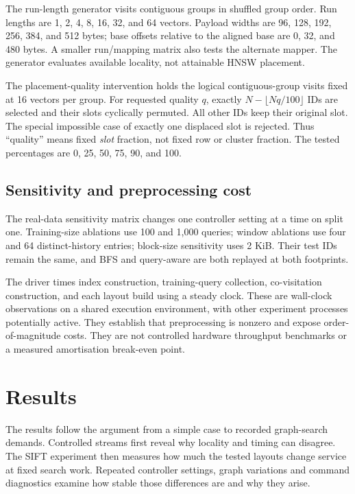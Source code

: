 \documentclass[11pt,a4paper]{report}
\newcommand{\QA}{query-aware}
\begin{document}
The run-length generator visits contiguous groups in shuffled group order. Run lengths are 1, 2, 4, 8, 16, 32, and 64 vectors. Payload widths are 96, 128, 192, 256, 384, and 512 bytes; base offsets relative to the aligned base are 0, 32, and 480 bytes. A smaller run/mapping matrix also tests the alternate mapper. The generator evaluates available locality, not attainable HNSW placement.

The placement-quality intervention holds the logical contiguous-group visits fixed at 16 vectors per group. For requested quality $q$, exactly $N-\lfloor Nq/100\rfloor$ IDs are selected and their slots cyclically permuted. All other IDs keep their original slot. The special impossible case of exactly one displaced slot is rejected. Thus ``quality'' means fixed \emph{slot} fraction, not fixed row or cluster fraction. The tested percentages are 0, 25, 50, 75, 90, and 100.

\section{Sensitivity and preprocessing cost}
The real-data sensitivity matrix changes one controller setting at a time on split one. Training-size ablations use 100 and 1,000 queries; window ablations use four and 64 distinct-history entries; block-size sensitivity uses 2 KiB. Their test IDs remain the same, and BFS and \QA{} are both replayed at both footprints.

The driver times index construction, training-query collection, co-visitation construction, and each layout build using a steady clock. These are wall-clock observations on a shared execution environment, with other experiment processes potentially active. They establish that preprocessing is nonzero and expose order-of-magnitude costs. They are not controlled hardware throughput benchmarks or a measured amortisation break-even point.



\chapter{Results}
\label{ch:results}
The results follow the argument from a simple case to recorded graph-search demands. Controlled streams first reveal why locality and timing can disagree. The SIFT experiment then measures how much the tested layouts change service at fixed search work. Repeated controller settings, graph variations and command diagnostics examine how stable those differences are and why they arise.
\end{document}
